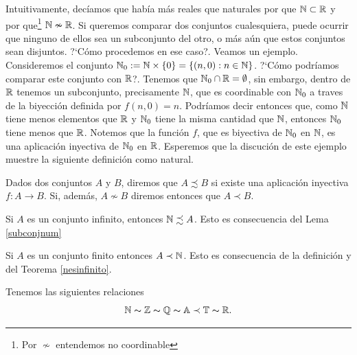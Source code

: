 Intuitivamente, decíamos que había más reales que
naturales por que $\mathbb{N}\subset\mathbb{R}$ y por que\footnote{Por $\nsim$
entendemos no coordinable} $\mathbb{N}\nsim\mathbb{R}$. Si queremos comparar dos
conjuntos cualesquiera, puede ocurrir que ninguno de ellos sea un
subconjunto del otro, o más aún que estos conjuntos sean
disjuntos. ?`Cómo procedemos en ese caso?. Veamos un ejemplo.
Consideremos el conjunto $\mathbb{N}_0:=\mathbb{N}\times
\{0\}=\{(n,0):n\in\mathbb{N}\}$. ?`Cómo podríamos comparar este
conjunto con $\mathbb{R}$?. Tenemos que $\mathbb{N}_0\cap\mathbb{R}=\emptyset$, sin
embargo, dentro de $\mathbb{R}$ tenemos un subconjunto, precisamente
$\mathbb{N}$, que es coordinable con $\mathbb{N}_0$ a traves de la biyección
definida por $f(n,0)=n$. Podríamos decir entonces que, como
$\mathbb{N}$ tiene menos elementos que $\mathbb{R}$ y $\mathbb{N}_0$ tiene la misma
cantidad que $\mathbb{N}$, entonces $\mathbb{N}_0$ tiene menos que $\mathbb{R}$.
Notemos que la función $f$, que es biyectiva de $\mathbb{N}_0$ en
$\mathbb{N}$, es una aplicación inyectiva de $\mathbb{N}_0$ en $\mathbb{R}$.
Esperemos que la discución de este ejemplo muestre la
siguiente definición como natural.

\begin{definicion}\label{relorden} Dados dos conjuntos $A$ y $B$, diremos que
$A\precsim B$ si existe una aplicación inyectiva
$f:A\longrightarrow B$. Si, además, $A\nsim B$ diremos entonces
que $A\prec B$.
\end{definicion}


\begin{ejemplo} Si $A$ es un conjunto infinito, entonces
$\mathbb{N}\precsim A $. Esto es consecuencia del Lema \vref{subconjnum}
\end{ejemplo}

\begin{ejemplo} Si $A$ es un conjunto finito entonces $A\prec\mathbb{N}$.
Esto es consecuencia de la definición y del Teorema
\vref{nesinfinito}.
\end{ejemplo}

\begin{ejemplo} Tenemos las siguientes relaciones
\[\mathbb{N}\thicksim\mathbb{Z}\thicksim\mathbb{Q}\thicksim\mathbb{A}\prec\mathbb{T}\thicksim\mathbb{R}.\]
\end{ejemplo}

